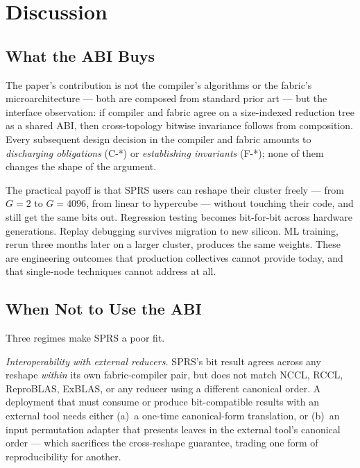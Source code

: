 \documentclass[journal,10pt]{IEEEtran}
\theoremstyle{plain}
\theoremstyle{definition}
\theoremstyle{remark}
\newcommand{\sprs}{\textsc{SPRS}}
\begin{document}
\section{Discussion}\label{sec:discussion}

\subsection{What the ABI Buys}

The paper's contribution is not the compiler's algorithms or the
fabric's microarchitecture --- both are composed from standard prior art
--- but the interface observation: if compiler and fabric agree on a
size-indexed reduction tree as a shared ABI, then cross-topology bitwise
invariance follows from composition. Every subsequent design decision
in the compiler and fabric amounts to \emph{discharging obligations}
(\textsf{C-*}) or \emph{establishing invariants} (\textsf{F-*}); none of
them changes the shape of the argument.

The practical payoff is that \sprs{} users can reshape their cluster
freely --- from $G=2$ to $G=4096$, from linear to hypercube --- without
touching their code, and still get the same bits out. Regression testing
becomes bit-for-bit across hardware generations. Replay debugging
survives migration to new silicon. ML training, rerun three months
later on a larger cluster, produces the same weights. These are
engineering outcomes that production collectives cannot provide today,
and that single-node techniques cannot address at all.

\subsection{When Not to Use the ABI}\label{sec:discussion-notuse}

Three regimes make \sprs{} a poor fit.

\emph{Interoperability with external reducers.} \sprs{}'s bit result
agrees across any reshape \emph{within} its own fabric-compiler pair,
but does not match NCCL, RCCL, ReproBLAS, ExBLAS, or any reducer using
a different canonical order. A deployment that must consume or produce
bit-compatible results with an external tool needs either (a)~a
one-time canonical-form translation, or (b)~an input permutation adapter
that presents leaves in the external tool's canonical order --- which
sacrifices the cross-reshape guarantee, trading one form of
reproducibility for another.
\end{document}
